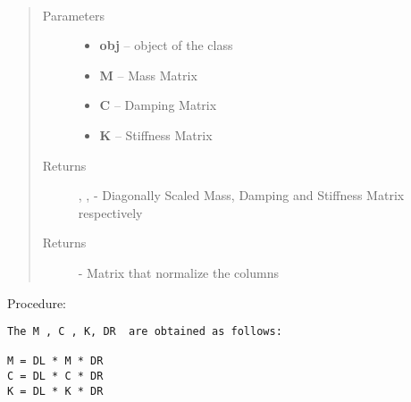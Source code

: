 \documentclass[letterpaper,10pt,english]{sphinxmanual}
\begin{document}
\begin{fulllineitems}
\label{index:brake.initialize.diagscale.diag_scale_matrices}~\begin{quote}\begin{description}
\item[{Parameters}] \leavevmode\begin{itemize}
\item {} 
\textbf{obj} -- object of the class 

\item {} 
\textbf{M} -- Mass Matrix

\item {} 
\textbf{C} -- Damping Matrix

\item {} 
\textbf{K} -- Stiffness Matrix

\end{itemize}

\item[{Returns}] \leavevmode
{}, ,  - Diagonally Scaled  Mass, Damping and Stiffness Matrix respectively

\item[{Returns}] \leavevmode
{} - Matrix that normalize the columns

\end{description}\end{quote}

Procedure:

\begin{Verbatim}[commandchars=\\\{\}]
The M , C , K, DR  are obtained as follows:

M = DL * M * DR
C = DL * C * DR
K = DL * K * DR
\end{Verbatim}

\end{fulllineitems}

\end{document}
